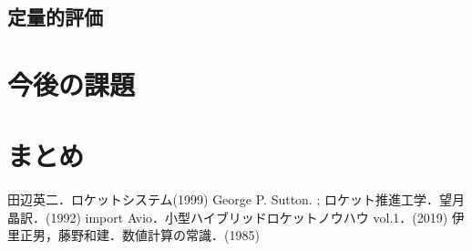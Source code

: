 \documentclass[a4j,10pt]{jsarticle}
\begin{document}
\subsection{定量的評価}

\section{今後の課題}

\section{まとめ}

% 
% 

\begin{thebibliography}{99}
		田辺英二．ロケットシステム(1999)
		George P. Sutton. ; ロケット推進工学．望月晶訳．(1992)
		import Avio．小型ハイブリッドロケットノウハウ vol.1．(2019)
		伊里正男，藤野和建．数値計算の常識．(1985)
\end{thebibliography}
\end{document}
